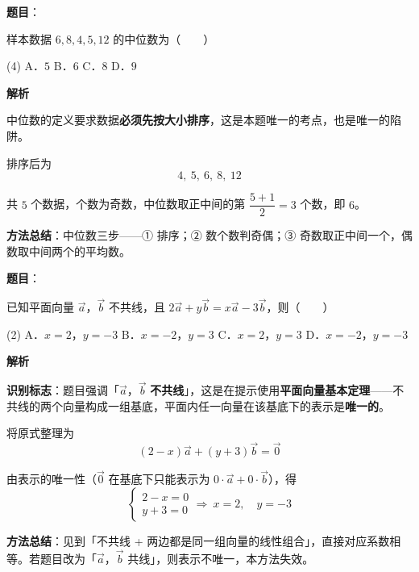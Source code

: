 \begin{answer}

\textbf{题目}：

样本数据 $6,8,4,5,12$ 的中位数为\mbox{（　　）}

\begin{gkopts}(4)
\task A．$5$
\task B．$6$
\task C．$8$
\task D．$9$
\end{gkopts}

\textbf{解析}

中位数的定义要求数据\textbf{必须先按大小排序}，这是本题唯一的考点，也是唯一的陷阱。

排序后为
\nopagebreak[4]
\[4,\ 5,\ 6,\ 8,\ 12\]

共 $5$ 个数据，个数为奇数，中位数取正中间的第 $\dfrac{5+1}{2}=3$ 个数，即 $6$。

\begin{gktip}
\textbf{方法总结}：中位数三步——① 排序；② 数个数判奇偶；③ 奇数取正中间一个，偶数取中间两个的平均数。
\end{gktip}


\par\medskip

\end{answer}
\begin{answer}

\textbf{题目}：

已知平面向量 $\vec{a}$，$\vec{b}$ 不共线，且 $2\vec{a}+y\vec{b}=x\vec{a}-3\vec{b}$，则\mbox{（　　）}

\begin{gkopts}(2)
\task A．$x=2$，$y=-3$
\task B．$x=-2$，$y=3$
\task C．$x=2$，$y=3$
\task D．$x=-2$，$y=-3$
\end{gkopts}

\textbf{解析}

\textbf{识别标志}：题目强调「$\vec a$，$\vec b$ \textbf{不共线}」，这是在提示使用\textbf{平面向量基本定理}——不共线的两个向量构成一组基底，平面内任一向量在该基底下的表示是\textbf{唯一的}。

将原式整理为
\nopagebreak[4]
\[(2-x)\vec a+(y+3)\vec b=\vec 0\]

由表示的唯一性（$\vec 0$ 在基底下只能表示为 $0\cdot\vec a+0\cdot\vec b$），得
\nopagebreak[4]
\[\begin{cases}2-x=0\\ y+3=0\end{cases}\Longrightarrow\ x=2,\quad y=-3\]

\begin{gktip}
\textbf{方法总结}：见到「不共线 + 两边都是同一组向量的线性组合」，直接对应系数相等。若题目改为「$\vec a$，$\vec b$ 共线」，则表示不唯一，本方法失效。
\end{gktip}


\par\medskip

\end{answer}
